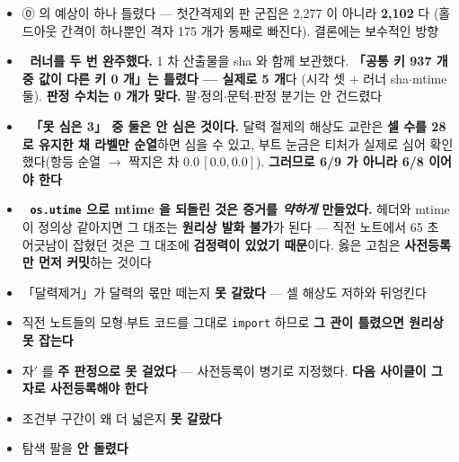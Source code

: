 \documentclass{article}
\begin{document}
\begin{itemize}
\item ⓪ 의 예상이 하나 틀렸다 --- 첫간격제외 판 군집은 2{,}277 이 아니라 \textbf{2{,}102} 다
      (홀드아웃 간격이 하나뿐인 격자 175 개가 통째로 빠진다). 결론에는 보수적인 방향
\item 🔴 \textbf{러너를 두 번 완주했다.} 1 차 산출물을 sha 와 함께 보관했다.
      \textbf{「공통 키 937 개 중 값이 다른 키 0 개」는 틀렸다 --- 실제로 5 개}다
      (시각 셋 $+$ 러너 sha$\cdot$mtime 둘). \textbf{판정 수치는 0 개가 맞다.}
      팔$\cdot$정의$\cdot$문턱$\cdot$판정 분기는 안 건드렸다
\item 🔴 \textbf{「못 심은 3」 중 둘은 안 심은 것이다.} 달력 절제의 해상도 교란은
      \textbf{셀 수를 28 로 유지한 채 라벨만 순열}하면 심을 수 있고,
      부트 눈금은 티처가 실제로 심어 확인했다(항등 순열 $\to$ 짝지은 차 $0.0\,[0.0, 0.0]$).
      \textbf{그러므로 6/9 가 아니라 6/8 이어야 한다}
\item 🔴 \textbf{\texttt{os.utime} 으로 mtime 을 되돌린 것은 증거를 \emph{약하게} 만들었다.}
      헤더와 mtime 이 정의상 같아지면 그 대조는 \textbf{원리상 발화 불가}가 된다
      --- 직전 노트에서 65 초 어긋남이 잡혔던 것은 그 대조에 \textbf{검정력이 있었기 때문}이다.
      옳은 고침은 \textbf{사전등록만 먼저 커밋}하는 것이다
\item 「달력제거」가 달력의 몫만 떼는지 \textbf{못 갈랐다} --- 셀 해상도 저하와 뒤엉킨다
\item 직전 노트들의 모형$\cdot$부트 코드를 그대로 \texttt{import} 하므로 \textbf{그 관이 틀렸으면 원리상 못 잡는다}
\item 자$'$ 를 \textbf{주 판정으로 못 걸었다} --- 사전등록이 병기로 지정했다.
      \textbf{다음 사이클이 그 자로 사전등록해야 한다}
\item 조건부 구간이 왜 더 넓은지 \textbf{못 갈랐다}
\item 탐색 팔을 \textbf{안 돌렸다}
\end{itemize}
\end{document}
